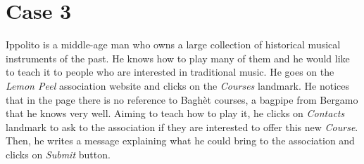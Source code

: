 \documentclass[../../DD.tex]{subfiles}
\begin{document}
\section{Case 3}

	Ippolito is a middle-age man who owns a large collection of historical musical instruments of the past. He knows how to play many of them and he would like to teach it to people who are interested in traditional music.
	\newline He goes on the \textit{Lemon Peel} association website and clicks on the \textit{Courses} landmark. He notices that in the page there is no reference to Baghèt courses, a bagpipe from Bergamo that he knows very well. Aiming to teach how to play it, he clicks on \textit{Contacts} landmark to ask to the association if they are interested to offer this new \textit{Course}. Then, he writes a message explaining what he could bring to the association and clicks on \textit{Submit} button.
	
\end{document}
